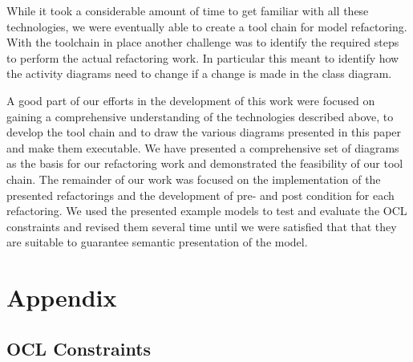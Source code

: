 \documentclass{llncs}
\begin{document}
While it took a considerable amount of time to get familiar with all these technologies, we were eventually able to
create a tool chain for model refactoring. With the toolchain in place another challenge was to identify the required 
steps to perform the actual refactoring work. In particular this meant to identify how the activity diagrams need to 
change if a change is made in the class diagram.

A good part of our efforts in the development of this work were focused on gaining a comprehensive understanding of the
technologies described above, to develop the tool chain and to draw the various diagrams presented in this paper and make 
them executable. We have presented a comprehensive set of diagrams as the basis for our refactoring work and demonstrated 
the feasibility of our tool chain. The remainder of our work was focused on the implementation of the presented refactorings and
the development of pre- and post condition for each refactoring. We used the presented example models to test and evaluate the
OCL constraints and revised them several time until we were satisfied that that they are suitable to guarantee semantic presentation
of the model.

\newpage



\newpage
\appendix
\section{Appendix}
\label{sec:appendix}

\subsection{OCL Constraints}
\label{sec:appconstraints}
\end{document}
